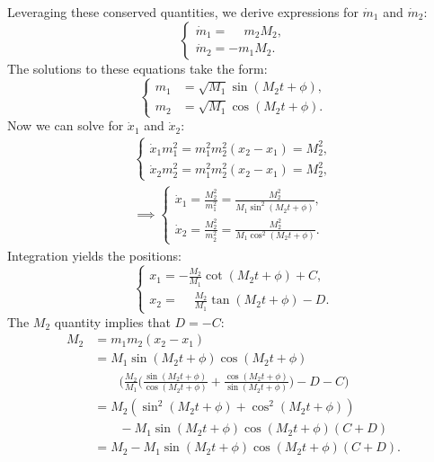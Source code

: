 \documentclass[english,master]{liumaiex}
\theoremstyle{plain}
\theoremstyle{definition}
\begin{document}
%
Leveraging these conserved quantities, we derive expressions for $\dot{m}_1$ and $\dot{m}_2$:
\begin{equation}
\left\{ \begin{aligned}
	\dot{m}_1 = \phantom{-}m_2M_2, \\
	\dot{m}_2 = -m_1M_2.
\end{aligned} \right.
\end{equation}
%
The solutions to these equations take the form:
\begin{equation}
\left\{ \begin{aligned}
	m_1 &= \sqrt{M_1} \sin(M_2t + \phi), \\
	m_2 &= \sqrt{M_1} \cos(M_2t + \phi).
\end{aligned} \right.
\end{equation}
%
Now we can solve for $\dot{x}_1$ and $\dot{x}_2$:
\begin{align}
\left\{ \begin{aligned}
	\dot{x}_1m_1^2 = m_1^2m_2^2(x_2 - x_1) = M_2^2, \\
	\dot{x}_2m_2^2 = m_1^2m_2^2(x_2 - x_1) = M_2^2,
\end{aligned} \right. \\
\implies \left\{ \begin{aligned}
	\dot{x}_1 = \frac{M_2^2}{m_1^2} = \frac{M_2^2}{M_1\sin^2(M_2t + \phi)}, \\
	\dot{x}_2 = \frac{M_2^2}{m_2^2} = \frac{M_2^2}{M_1\cos^2(M_2t + \phi)}.
\end{aligned} \right.
\end{align}
%
Integration yields the positions:
\begin{equation}
\left\{ \begin{aligned}
	x_1 = -\frac{M_2}{M_1}\cot(M_2t + \phi) + C,\\
	x_2 = \phantom{-}\frac{M_2}{M_1}\tan(M_2t + \phi) - D.
\end{aligned} \right.
\end{equation}
%
The $M_2$ quantity implies that $D = -C$:
\begin{equation}
\begin{aligned}
	M_2 &= m_1m_2(x_2 - x_1) \\
	&= M_1 \sin(M_2t + \phi) \cos(M_2t + \phi) \\
	& \qquad \Big( \frac{M_2}{M_1} \Big(\frac{\sin(M_2t + \phi)}{\cos(M_2t + \phi)} +
	\frac{\cos(M_2t + \phi)}{\sin(M_2t + \phi)}\Big) - D - C \Big) \\
	&= M_2(\sin^2(M_2t + \phi) + \cos^2(M_2t + \phi)) \\
	& \qquad - M_1 \sin(M_2t + \phi) \cos(M_2t + \phi)(C + D) \\
	&= M_2 - M_1 \sin(M_2t + \phi) \cos(M_2t + \phi)(C + D).
\end{aligned}
\end{equation}
\end{document}
